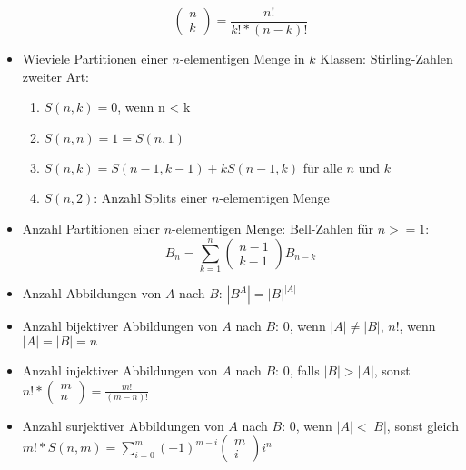 \documentclass[12pt,landscape]{article}
\begin{document}
\begin{multicols}{3}
\begin{itemize}
\[\begin{pmatrix}n \\ k\end{pmatrix} = \frac{n!}{k! * (n - k)!}\]
\item Wieviele Partitionen einer $n$-elementigen Menge in $k$ Klassen: Stirling-Zahlen zweiter Art:
\begin{enumerate}
\item $S(n,k) = 0$, wenn n < k
\item $S(n, n) = 1 = S(n, 1)$
\item $S(n, k) = S(n - 1, k - 1) + kS(n - 1, k)$ für alle $n$ und $k$
\item $S(n, 2)$: Anzahl Splits einer $n$-elementigen Menge
\end{enumerate}
\item Anzahl Partitionen einer $n$-elementigen Menge: Bell-Zahlen für $n >= 1$: 
\[B_n = \sum_{k=1}^{n}\begin{pmatrix}n - 1 \\ k - 1\end{pmatrix} B_{n-k} \] 
\item Anzahl Abbildungen von $A$ nach $B$: $|B^A| = |B|^{|A|}$
\item Anzahl bijektiver Abbildungen von $A$ nach $B$: 0, wenn $|A| \neq |B|$, $n!$, wenn $|A| = |B| = n$
\item Anzahl injektiver Abbildungen von $A$ nach $B$: 0, falls $|B| > |A|$, sonst $n! * \begin{pmatrix}m \\ n\end{pmatrix} = \frac{m!}{(m - n)!}$
\item Anzahl surjektiver Abbildungen von $A$ nach $B$: 0, wenn $|A| < |B|$, sonst gleich $m! * S(n,m) = \sum_{i=0}^{m} (-1)^{m-i}\begin{pmatrix}m \\ i\end{pmatrix} i^n$
\end{itemize}

\end{multicols}
\end{document}
